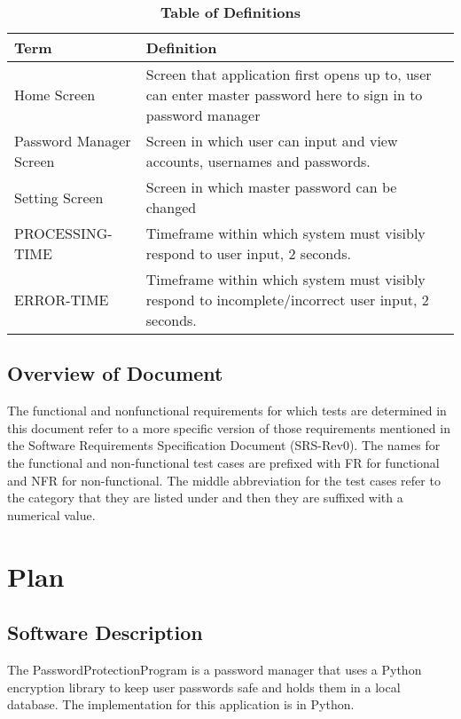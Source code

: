 \documentclass[12pt, titlepage]{article}
\begin{document}
\begin{table}[!htbp]
\caption{\textbf{Table of Definitions}} \label{1Table}

    \begin{tabularx}{\textwidth}{p{3cm}X}
        \toprule
        \textbf{Term} & \textbf{Definition}\\
        \midrule
        Home Screen & Screen that application first opens up to, user can enter master password here to sign in to password manager\\\hline
        Password Manager Screen & Screen in which user can input and view accounts, usernames and passwords.\\\hline
        Setting Screen & Screen in which master password can be changed\\\hline
        PROCESSING-TIME & Timeframe within which system must visibly  respond to user input, 2 seconds.\\\hline
        ERROR-TIME & Timeframe within which system must visibly respond to incomplete/incorrect user input, 2 seconds.\\
        \bottomrule
    \end{tabularx}

\end{table}	

\subsection{Overview of Document}
The functional and nonfunctional requirements for which tests are determined in this document refer to a more specific version of those requirements mentioned in the Software Requirements Specification Document (SRS-Rev0). The names for the functional and non-functional test cases are prefixed with FR for functional and NFR for non-functional. The middle abbreviation for the test cases refer to the category that they are listed under and then they are suffixed with a numerical value.

\section{Plan}

\subsection{Software Description}
The PasswordProtectionProgram is a password manager that uses a Python encryption library to keep user passwords safe and holds them in a local database. The implementation for this application is in Python.
\end{document}
